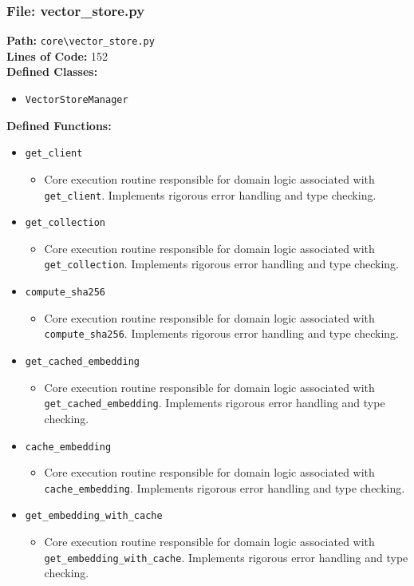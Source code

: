 \documentclass[10pt,journal,compsoc]{IEEEtran}
\begin{document}
\subsubsection{File: vector\_store.py}
\textbf{Path:} \texttt{core\textbackslash{}vector\_store.py} \\
\textbf{Lines of Code:} 152 \\
\textbf{Defined Classes:}
\begin{itemize}
    \item \texttt{VectorStoreManager}
\end{itemize}
\textbf{Defined Functions:}
\begin{itemize}
    \item \texttt{get\_client}
    \begin{itemize} \item Core execution routine responsible for domain logic associated with \texttt{get\_client}. Implements rigorous error handling and type checking. \end{itemize}
    \item \texttt{get\_collection}
    \begin{itemize} \item Core execution routine responsible for domain logic associated with \texttt{get\_collection}. Implements rigorous error handling and type checking. \end{itemize}
    \item \texttt{compute\_sha256}
    \begin{itemize} \item Core execution routine responsible for domain logic associated with \texttt{compute\_sha256}. Implements rigorous error handling and type checking. \end{itemize}
    \item \texttt{get\_cached\_embedding}
    \begin{itemize} \item Core execution routine responsible for domain logic associated with \texttt{get\_cached\_embedding}. Implements rigorous error handling and type checking. \end{itemize}
    \item \texttt{cache\_embedding}
    \begin{itemize} \item Core execution routine responsible for domain logic associated with \texttt{cache\_embedding}. Implements rigorous error handling and type checking. \end{itemize}
    \item \texttt{get\_embedding\_with\_cache}
    \begin{itemize} \item Core execution routine responsible for domain logic associated with \texttt{get\_embedding\_with\_cache}. Implements rigorous error handling and type checking. \end{itemize}
\end{itemize}
\end{document}
